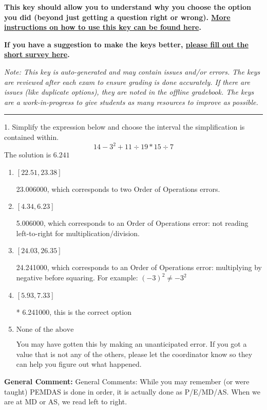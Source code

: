 \documentclass{extbook}[14pt]
\begin{document}
\textbf{This key should allow you to understand why you choose the option you did (beyond just getting a question right or wrong). \href{https://xronos.clas.ufl.edu/mac1105spring2020/courseDescriptionAndMisc/Exams/LearningFromResults}{More instructions on how to use this key can be found here}.}

\textbf{If you have a suggestion to make the keys better, \href{https://forms.gle/CZkbZmPbC9XALEE88}{please fill out the short survey here}.}

\textit{Note: This key is auto-generated and may contain issues and/or errors. The keys are reviewed after each exam to ensure grading is done accurately. If there are issues (like duplicate options), they are noted in the offline gradebook. The keys are a work-in-progress to give students as many resources to improve as possible.}

\rule{\textwidth}{0.4pt}

1. Simplify the expression below and choose the interval the simplification is contained within.
\[ 14 - 3^2 + 11 \div 19 * 15 \div 7 \] 
The solution is $ 6.241 $ 

\begin{enumerate}[label=\Alph*.] 
\item $ [22.51, 23.38] $ 

  23.006000, which corresponds to two Order of Operations errors. 
\item $ [4.34, 6.23] $ 

  5.006000, which corresponds to an Order of Operations error: not reading left-to-right for multiplication/division. 
\item $ [24.03, 26.35] $ 

  24.241000, which corresponds to an Order of Operations error: multiplying by negative before squaring. For example: $(-3)^2 \neq -3^2$ 
\item $ [5.93, 7.33] $ 

 * 6.241000, this is the correct option 
\item $ \text{None of the above} $ 

  You may have gotten this by making an unanticipated error. If you got a value that is not any of the others, please let the coordinator know so they can help you figure out what happened. 
\end{enumerate} 
 
\textbf{General Comment:} General Comments: While you may remember (or were taught) PEMDAS is done in order, it is actually done as P/E/MD/AS. When we are at MD or AS, we read left to right. 
\end{document}

